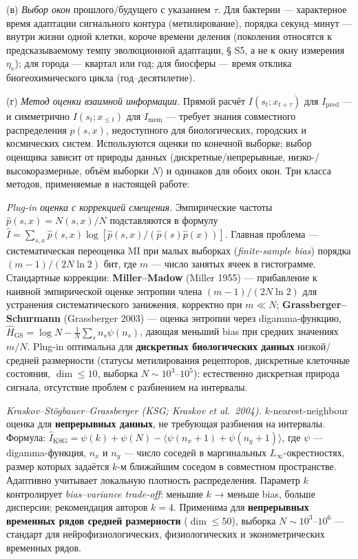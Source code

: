 \documentclass[pdflatex,sn-mathphys-ay]{sn-jnl}
\begin{document}
(в) \emph{Выбор окон} прошлого/будущего с указанием \(\tau\). Для бактерии --- характерное время адаптации сигнального контура (метилирование), порядка секунд--минут --- внутри жизни одной клетки, короче времени деления (поколения относятся к предсказываемому темпу эволюционной адаптации, § S5, а не к окну измерения \(\eta_v\)); для города --- квартал или год; для биосферы --- время отклика биогеохимического цикла (год--десятилетие).

(г) \emph{Метод оценки взаимной информации.} Прямой расчёт \(I(s_t; x_{t+\tau})\) для \(I_{\text{pred}}\) --- и симметрично \(I(s_t; x_{\le t})\) для \(I_{\text{mem}}\) --- требует знания совместного распределения \(p(s, x)\), недоступного для биологических, городских и космических систем. Используются оценки по конечной выборке; выбор оценщика зависит от природы данных (дискретные/непрерывные, низко-/высокоразмерные, объём выборки \(N\)) и одинаков для обоих окон. Три класса методов, применяемые в настоящей работе:

\emph{Plug-in оценка с коррекцией смещения.} Эмпирические частоты \(\hat p(s, x) = N(s, x)/N\) подставляются в формулу \(\hat I = \sum_{s, x} \hat p(s, x) \log[\hat p(s, x)/(\hat p(s) \hat p(x))]\). Главная проблема --- систематическая переоценка MI при малых выборках (\emph{finite-sample bias}) порядка \((m-1)/(2N \ln 2)\) бит, где \(m\) --- число занятых ячеек в гистограмме. Стандартные коррекции: \textbf{Miller--Madow} (Miller 1955) --- прибавление к наивной эмпирической оценке энтропии члена \((m-1)/(2N \ln 2)\) для устранения систематического занижения, корректно при \(m \ll N\); \textbf{Grassberger--Schurmann} (Grassberger 2003) --- оценка энтропии через digamma-функцию, \(\hat H_{\text{GS}} = \log N - \frac{1}{N} \sum_s n_s \psi(n_s)\), дающая меньший bias при средних значениях \(m/N\). Plug-in оптимальна для \textbf{дискретных биологических данных} низкой/средней размерности (статусы метилирования рецепторов, дискретные клеточные состояния, \(\dim \le 10\), выборка \(N \sim 10^3\)--\(10^5\)): естественно дискретная природа сигнала, отсутствие проблем с разбиением на интервалы.

\emph{Kraskov--Stögbauer--Grassberger (KSG; Kraskov et al.~2004).} \(k\)-nearest-neighbour оценка для \textbf{непрерывных данных}, не требующая разбиения на интервалы. Формула: \(\hat I_{\text{KSG}} = \psi(k) + \psi(N) - \langle \psi(n_x + 1) + \psi(n_y + 1) \rangle\), где \(\psi\) --- digamma-функция, \(n_x\) и \(n_y\) --- число соседей в маргинальных \(L_\infty\)-окрестностях, размер которых задаётся \(k\)-м ближайшим соседом в совместном пространстве. Адаптивно учитывает локальную плотность распределения. Параметр \(k\) контролирует \emph{bias--variance trade-off}: меньшие \(k\) → меньше bias, больше дисперсии; рекомендация авторов \(k = 4\). Применима для \textbf{непрерывных временных рядов средней размерности} (\(\dim \le 50\)), выборка \(N \sim 10^3\)--\(10^6\) --- стандарт для нейрофизиологических, физиологических и эконометрических временных рядов.
\end{document}

